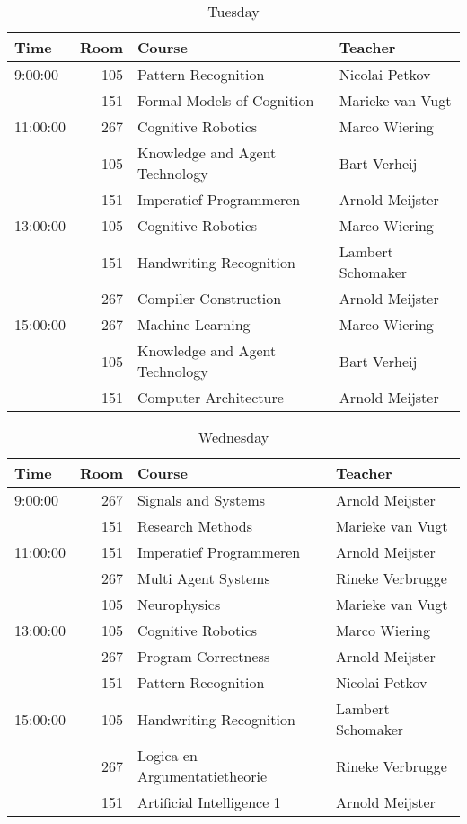 \begin{table}
    \centering
    \caption{Tuesday}
    \begin{tabular}{l|r|l|l}
        Time & Room & Course & Teacher \\ \hline
        \hline
        9:00:00 & 105 & Pattern Recognition & Nicolai Petkov\\
        & 151 & Formal Models of Cognition & Marieke van Vugt\\\hline
        11:00:00 & 267 & Cognitive Robotics & Marco Wiering\\
        & 105 & Knowledge and Agent Technology & Bart Verheij\\
        & 151 & Imperatief Programmeren & Arnold Meijster\\\hline
        13:00:00 & 105 & Cognitive Robotics & Marco Wiering\\
        & 151 & Handwriting Recognition & Lambert Schomaker\\
        & 267 & Compiler Construction & Arnold Meijster\\\hline
        15:00:00 & 267 & Machine Learning & Marco Wiering\\
        & 105 & Knowledge and Agent Technology & Bart Verheij\\
        & 151 & Computer Architecture & Arnold Meijster\\
    \end{tabular}
\end{table}

\begin{table}
    \centering
    \caption{Wednesday}
    \begin{tabular}{l|r|l|l}
        Time & Room & Course & Teacher \\ \hline
        \hline
        9:00:00 & 267 & Signals and Systems & Arnold Meijster\\
        & 151 & Research Methods & Marieke van Vugt\\\hline
        11:00:00 & 151 & Imperatief Programmeren & Arnold Meijster\\
        & 267 & Multi Agent Systems & Rineke Verbrugge\\
        & 105 & Neurophysics & Marieke van Vugt\\\hline
        13:00:00 & 105 & Cognitive Robotics & Marco Wiering\\
        & 267 & Program Correctness & Arnold Meijster\\
        & 151 & Pattern Recognition & Nicolai Petkov\\\hline
        15:00:00 & 105 & Handwriting Recognition & Lambert Schomaker\\
        & 267 & Logica en Argumentatietheorie & Rineke Verbrugge\\
        & 151 & Artificial Intelligence 1 & Arnold Meijster\\
    \end{tabular}
\end{table}

